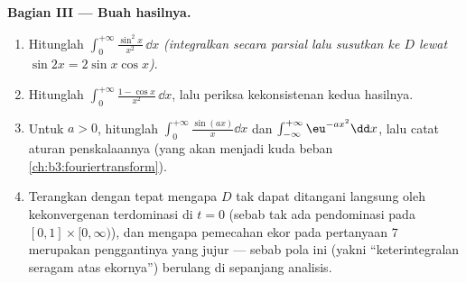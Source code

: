 \begin{problem}
\medskip
\noindent\textbf{Bagian III --- Buah hasilnya.}
\begin{enumerate}[resume]
  \item Hitunglah $\int_0^{+\infty}\frac{\sin^2x}{x^2}\,\dd x$
        \emph{(integralkan secara parsial lalu susutkan ke $D$ lewat $\sin
        2x = 2\sin x\cos x$)}.
  \item Hitunglah $\int_0^{+\infty}\frac{1 -
        \cos x}{x^2}\,\dd x$, lalu periksa kekonsistenan
        kedua hasilnya.
  \item Untuk $a > 0$, hitunglah
        $\int_0^{+\infty}\frac{\sin(ax)}x\dd x$ dan
        $\int_{-\infty}^{+\infty}\eu^{-ax^2}\dd x$, lalu catat
        aturan penskalaannya (yang akan menjadi kuda beban
        \cref{ch:b3:fouriertransform}).
  \item Terangkan dengan tepat mengapa $D$ tak dapat ditangani
        langsung oleh kekonvergenan terdominasi di $t = 0$ (sebab tak ada pendominasi  pada
        $[0,1]\times[0,\infty)$), dan mengapa pemecahan ekor pada
        pertanyaan 7 merupakan penggantinya yang jujur --- sebab pola ini
        (yakni ``keterintegralan seragam atas ekornya'') berulang di sepanjang
        analisis.
\end{enumerate}


\end{problem}
